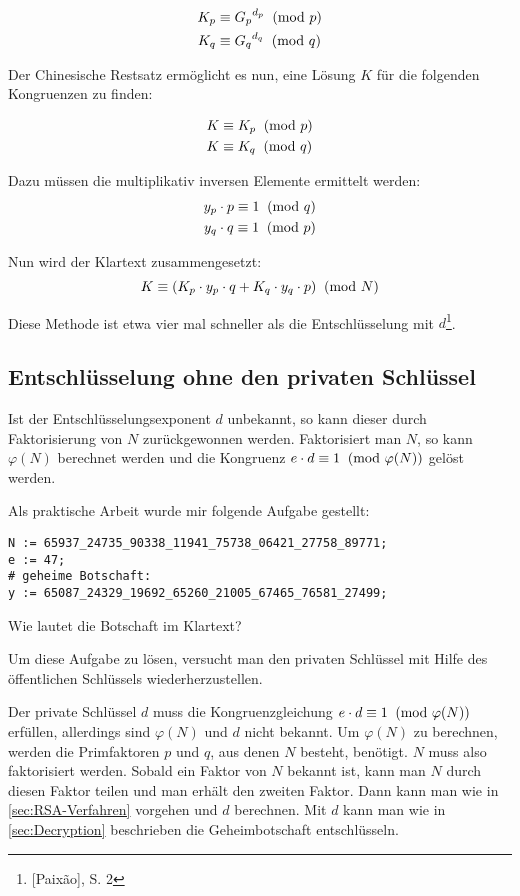 \begin{align*}
K_p &\equiv {G_p} ^ {d_p} \imod{p}\\
K_q &\equiv {G_q} ^ {d_q} \imod{q}
\end{align*}

Der Chinesische Restsatz ermöglicht es nun, eine Lösung $K$ für die
folgenden Kongruenzen zu finden:

\begin{align*}
K &\equiv K_p \imod{p}\\
K &\equiv K_q \imod{q}
\end{align*}

Dazu müssen die multiplikativ inversen Elemente ermittelt werden:
\begin{align*}
y_p \cdot p \equiv 1 \imod{q}\\
y_q \cdot q \equiv 1 \imod{p}
\end{align*}

Nun wird der Klartext zusammengesetzt:
\[K \equiv (K_p \cdot y_p \cdot q + K_q \cdot y_q \cdot p) \imod{N}\]

Diese Methode ist etwa vier mal schneller als die Entschlüsselung mit $d$\footnote{[Paixão], S. 2}.

\subsection{Entschlüsselung ohne den privaten Schlüssel}
Ist der Entschlüsselungsexponent $d$ unbekannt, so kann dieser durch
Faktorisierung von $N$ zurückgewonnen werden. Faktorisiert man $N$, so
kann $\varphi(N)$ berechnet werden und die Kongruenz $e \cdot d \equiv 1 \imod{\varphi(N)}$ gelöst werden.

Als praktische Arbeit wurde mir folgende Aufgabe gestellt:

\begin{mdframed}[tikzsetting={draw=black,very thick}, innertopmargin=0.6cm]
\begin{verbatim}
N := 65937_24735_90338_11941_75738_06421_27758_89771;
e := 47;
# geheime Botschaft:
y := 65087_24329_19692_65260_21005_67465_76581_27499;
\end{verbatim}
Wie lautet die Botschaft im Klartext?
\end{mdframed}

Um diese Aufgabe zu lösen, versucht man den privaten Schlüssel mit
Hilfe des öffentlichen Schlüssels wiederherzustellen.

Der private Schlüssel $d$ muss die Kongruenzgleichung
$e \cdot d \equiv 1 \imod{\varphi(N)}$ erfüllen, allerdings sind
$\varphi(N)$ und $d$ nicht bekannt. Um $\varphi(N)$ zu berechnen,
werden die Primfaktoren $p$ und $q$, aus denen $N$ besteht, benötigt.
$N$ muss also faktorisiert werden. Sobald ein Faktor von $N$ bekannt
ist, kann man $N$ durch diesen Faktor teilen und man erhält den
zweiten Faktor. Dann kann man wie in \cref{sec:RSA-Verfahren} vorgehen und $d$
berechnen. Mit $d$ kann man wie in \cref{sec:Decryption} beschrieben die
Geheimbotschaft entschlüsseln.

